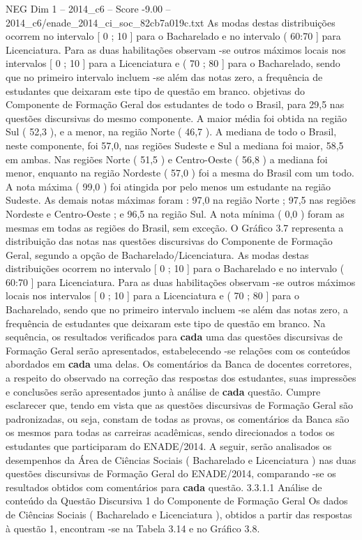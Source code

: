 \begin{textsample}{NEG Dim 1 – 2014\_c6 – Score -9.00 – 2014\_c6/enade\_2014\_ci\_soc\_82cb7a019c.txt}
As modas destas distribuições ocorrem no intervalo [ 0 ; 10 ] para o Bacharelado e no intervalo ( 60:70 ] para Licenciatura.
Para as duas habilitações observam -se outros máximos locais nos intervalos [ 0 ; 10 ] para a Licenciatura e ( 70 ; 80 ] para o Bacharelado, sendo que no primeiro intervalo incluem -se além das notas zero, a frequência de estudantes que deixaram este tipo de questão em branco. objetivas do Componente de Formação Geral dos estudantes de todo o Brasil, para 29,5 nas questões discursivas do mesmo componente.
A maior média foi obtida na região Sul ( 52,3 ), e a menor, na região Norte ( 46,7 ).
A mediana de todo o Brasil, neste componente, foi 57,0, nas regiões Sudeste e Sul a mediana foi maior, 58,5 em ambas.
Nas regiões Norte ( 51,5 ) e Centro-Oeste ( 56,8 ) a mediana foi menor, enquanto na região Nordeste ( 57,0 ) foi a mesma do Brasil com um todo.
A nota máxima ( 99,0 ) foi atingida por pelo menos um estudante na região Sudeste.
As demais notas máximas foram : 97,0 na região Norte ; 97,5 nas regiões Nordeste e Centro-Oeste ; e 96,5 na região Sul.
A nota mínima ( 0,0 ) foram as mesmas em todas as regiões do Brasil, sem exceção.
O Gráfico 3.7 representa a distribuição das notas nas questões discursivas do Componente de Formação Geral, segundo a opção de Bacharelado/Licenciatura.
As modas destas distribuições ocorrem no intervalo [ 0 ; 10 ] para o Bacharelado e no intervalo ( 60:70 ] para Licenciatura.
Para as duas habilitações observam -se outros máximos locais nos intervalos [ 0 ; 10 ] para a Licenciatura e ( 70 ; 80 ] para o Bacharelado, sendo que no primeiro intervalo incluem -se além das notas zero, a frequência de estudantes que deixaram este tipo de questão em branco.
Na sequência, os resultados verificados para \textbf{cada} uma das questões discursivas de Formação Geral serão apresentados, estabelecendo -se relações com os conteúdos abordados em \textbf{cada} uma delas.
Os comentários da Banca de docentes corretores, a respeito do observado na correção das respostas dos estudantes, suas impressões e conclusões serão apresentados junto à análise de \textbf{cada} questão.
Cumpre esclarecer que, tendo em vista que as questões discursivas de Formação Geral são padronizadas, ou seja, constam de todas as provas, os comentários da Banca são os mesmos para todas as carreiras acadêmicas, sendo direcionados a todos os estudantes que participaram do ENADE/2014.
A seguir, serão analisados os desempenhos da Área de Ciências Sociais ( Bacharelado e Licenciatura ) nas duas questões discursivas de Formação Geral do ENADE/2014, comparando -se os resultados obtidos com comentários para \textbf{cada} questão. 3.3.1.1 Análise de conteúdo da Questão Discursiva 1 do Componente de Formação Geral Os dados de Ciências Sociais ( Bacharelado e Licenciatura ), obtidos a partir das respostas à questão 1, encontram -se na Tabela 3.14 e no Gráfico 3.8.

\end{textsample}
